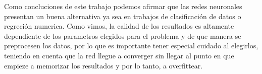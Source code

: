Como concluciones de este trabajo podemos afirmar que las redes neuronales presentan un buena alternativa ya sea en trabajos de clasificación de datos o regreción numerica. Como vimos, la calidad de los resultados es altamente dependiente de los parametros elegidos para el problema y de que manera se preprocesen los datos, por lo que es importante tener especial cuidado al elegirlos, teniendo en cuenta que la red llegue a converger sin llegar al punto en que empieze a memorizar los resultados y por lo tanto, a overfittear.